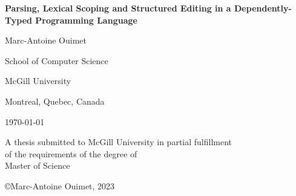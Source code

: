 \begin{titlepage}
\centering

\vspace*{0.5cm}

{\bfseries\LARGE Parsing, Lexical Scoping and Structured Editing in a Dependently-Typed Programming Language}

\vspace{1.8cm}

{\large Marc-Antoine Ouimet}

\vspace{2cm}

School of Computer Science

McGill University

Montreal, Quebec, Canada

\vspace{1.5cm}

\monthyeardate\today

\vspace{2cm}

A thesis submitted to McGill University in partial fulfillment\\
of the requirements of the degree of\\
Master of Science

\vfill

\copyright Marc-Antoine Ouimet, 2023
\end{titlepage}

